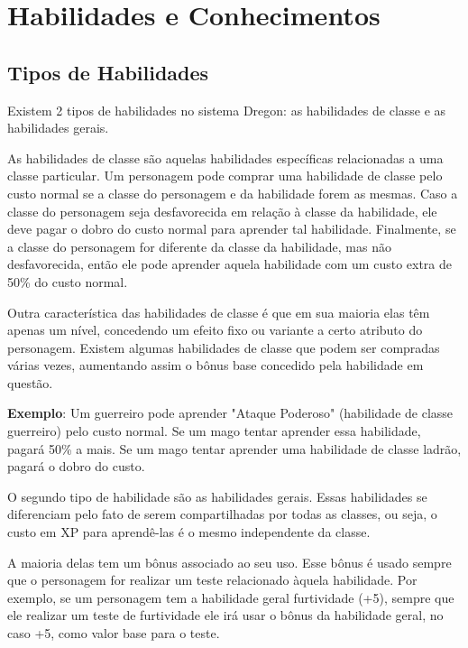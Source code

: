 
\chapter{Habilidades e Conhecimentos}
\label{Cap:Habilidades}

\section{Tipos de Habilidades}

Existem 2 tipos de habilidades no sistema Dregon: as habilidades de classe e as habilidades gerais. 

As habilidades de classe são aquelas habilidades específicas relacionadas a uma classe particular. Um personagem pode comprar uma habilidade de classe pelo custo normal se a classe do personagem e da habilidade forem as mesmas. Caso a classe do personagem seja desfavorecida em relação à classe da habilidade, ele deve pagar o dobro do custo normal para aprender tal habilidade. Finalmente, se a classe do personagem for diferente da classe da habilidade, mas não desfavorecida, então ele pode aprender aquela habilidade com um custo extra de 50\% do custo normal. 

Outra característica das habilidades de classe é que em sua maioria elas têm apenas um nível, concedendo um efeito fixo ou variante a certo atributo do personagem. Existem algumas habilidades de classe que podem ser compradas várias vezes, aumentando assim o bônus base concedido pela habilidade em questão.

\textbf{Exemplo}: Um guerreiro pode aprender "Ataque Poderoso" (habilidade de classe guerreiro) pelo custo normal. Se um mago tentar aprender essa habilidade, pagará 50\% a mais. Se um mago tentar aprender uma habilidade de classe ladrão, pagará o dobro do custo.

O segundo tipo de habilidade são as habilidades gerais. Essas habilidades se diferenciam pelo fato de serem compartilhadas por todas as classes, ou seja, o custo em XP para aprendê-las é o mesmo independente da classe. 

A maioria delas tem um bônus associado ao seu uso. Esse bônus é usado sempre que o personagem for realizar um teste relacionado àquela habilidade. Por exemplo, se um personagem tem a habilidade geral furtividade (+5), sempre que ele realizar um teste de furtividade ele irá usar o bônus da habilidade geral, no caso +5, como valor base para o teste. 


